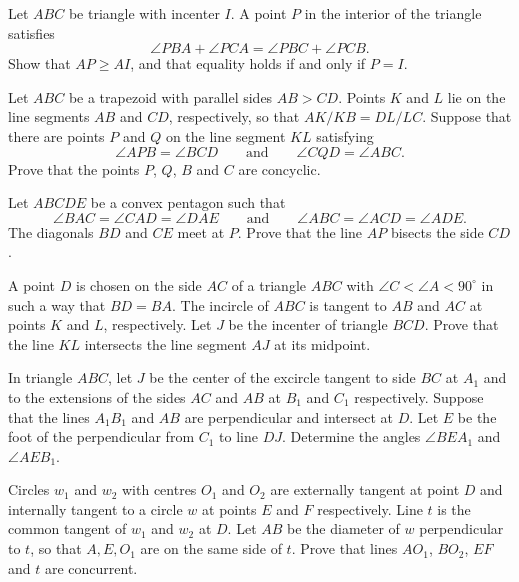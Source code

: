\item[\textbf{G1.}]
Let 
$ABC$
 be triangle with incenter 
$I$.
 A point 
$P$
 in the interior of the triangle satisfies 
\[\angle PBA+\angle PCA = \angle PBC+\angle PCB.\]
 Show that 
$AP \geq AI$, 
 and that equality holds if and only if 
$P=I$.

\item[\textbf{G2.}]
Let 
$ ABC$
 be a trapezoid with parallel sides 
$ AB > CD$.
 Points 
$ K$
 and 
$ L$
 lie on the line segments 
$ AB$
 and 
$ CD$, 
 respectively, so that 
$AK/KB=DL/LC$.
 Suppose that there are points 
$ P$
 and 
$ Q$
 on the line segment 
$ KL$
 satisfying 
\[\angle{APB} = \angle{BCD}\qquad\text{and}\qquad \angle{CQD} = \angle{ABC}.\]
 Prove that the points 
$ P$, 
$ Q$, 
$ B$
 and 
$ C$
 are concyclic.

\item[\textbf{G3.}]
Let 
$ ABCDE$
 be a convex pentagon such that
\[ \angle BAC = \angle CAD = \angle DAE\qquad \text{and}\qquad \angle ABC = \angle ACD = \angle ADE.
\]
The diagonals 
$BD$
 and 
$CE$
 meet at 
$P$.
  Prove that the line 
$AP$
 bisects the side 
$CD$.

\item[\textbf{G4.}]
A point 
$D$
 is chosen on the side 
$AC$
 of a triangle 
$ABC$
 with 
$\angle C < \angle A < 90^\circ$
 in such a way that 
$BD=BA$.
  The incircle of 
$ABC$
 is tangent to 
$AB$
 and 
$AC$
 at points 
$K$
 and 
$L$, 
 respectively.  Let 
$J$
 be the incenter of triangle 
$BCD$.
  Prove that the line 
$KL$
 intersects the line segment 
$AJ$
 at its midpoint.

\item[\textbf{G5.}]
In triangle 
$ABC$, 
 let 
$J$
 be the center of the excircle tangent to side 
$BC$
 at 
$A_{1}$
 and to the extensions of the sides 
$AC$
 and 
$AB$
 at 
$B_{1}$
 and 
$C_{1}$
 respectively. Suppose that the lines 
$A_{1}B_{1}$
 and 
$AB$
 are perpendicular and intersect at 
$D$.
 Let 
$E$
 be the foot of the perpendicular from 
$C_{1}$
 to line 
$DJ$.
 Determine the angles 
$\angle{BEA_{1}}$
 and 
$\angle{AEB_{1}}$.

\item[\textbf{G6.}]
Circles 
$ w_{1}$
 and 
$ w_{2}$
 with centres 
$ O_{1}$
 and 
$ O_{2}$
 are externally tangent at point 
$ D$
 and internally tangent to a circle 
$ w$
 at points 
$ E$
 and 
$ F$
 respectively. Line 
$ t$
 is the common tangent of 
$ w_{1}$
 and 
$ w_{2}$
 at 
$ D$.
 Let 
$ AB$
 be the diameter of 
$ w$
 perpendicular to 
$ t$, 
 so that 
$ A, E, O_{1}$
 are on the same side of 
$ t$.
 Prove that lines 
$ AO_{1}$, 
$ BO_{2}$, 
$ EF$
 and 
$ t$
 are concurrent.

